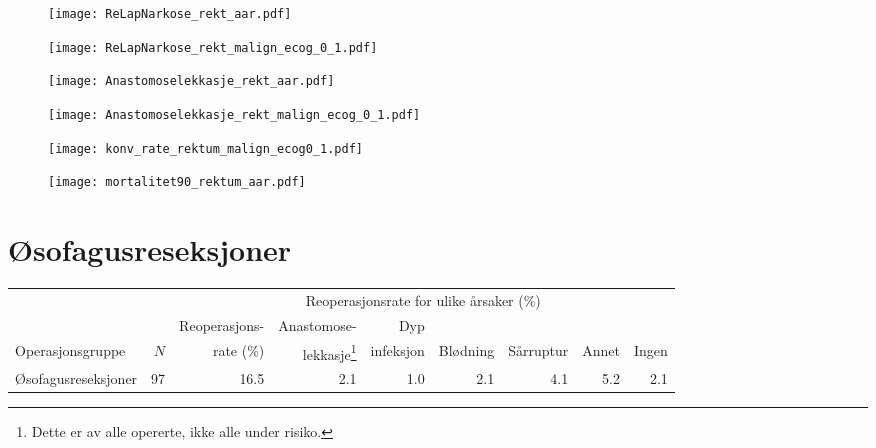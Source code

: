 \documentclass[norsk,a4paper]{article}\usepackage[]{graphicx}\usepackage[]{color}
\begin{document}
\clearpage

\begin{figure}[ht]
\centering
\texttt{[image: ReLapNarkose\_rekt\_aar.pdf]}
\caption{}
\end{figure}

\begin{figure}[ht]
\centering
\texttt{[image: ReLapNarkose\_rekt\_malign\_ecog\_0\_1.pdf]}
\caption{}
\end{figure}

\begin{figure}[ht]
\centering
\texttt{[image: Anastomoselekkasje\_rekt\_aar.pdf]}
\caption{}
\end{figure}

\begin{figure}[ht]
\centering
\texttt{[image: Anastomoselekkasje\_rekt\_malign\_ecog\_0\_1.pdf]}
\caption{}
\end{figure}

\begin{figure}[ht]
\centering
\texttt{[image: konv\_rate\_rektum\_malign\_ecog0\_1.pdf]}
\caption{}
\end{figure}

\begin{figure}[ht]
\centering
\texttt{[image: mortalitet90\_rektum\_aar.pdf]}
\caption{}
\end{figure}

\clearpage

\section{Øsofagusreseksjoner}

\begin{table}[htb]
\begin{minipage}{\textwidth}
\centering
\begin{tabular}{lrrrrrrrr}
  \toprule
  & & & \multicolumn{4}{c}{Reoperasjonsrate for ulike årsaker (\%)} \\
 \cline{4-9} 
 & & Reoperasjons- & Anastomose- & Dyp &&&&  \\
 Operasjonsgruppe & $N$ & rate (\%) & lekkasje\footnote[2]{Dette er av alle opererte, ikke
alle under risiko.} & infeksjon & Blødning & Sårruptur & Annet & Ingen \\
 \midrule
Øsofagusreseksjoner & 97 & 16.5 & 2.1 & 1.0 & 2.1 & 4.1 & 5.2 & 2.1 \\ 
   \bottomrule
\end{tabular}

\end{minipage}
\end{table}
\end{document}
